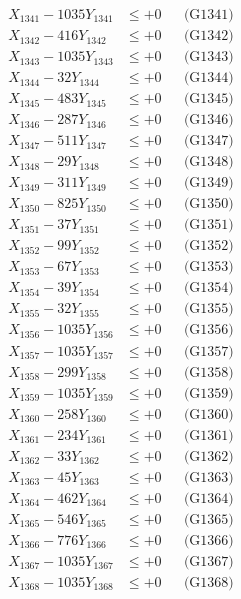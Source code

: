 \documentclass[a4paper,10pt]{article}
\begin{document}
{\begin{align}
\allowbreak
X_{1341} - 1035Y_{1341} &\leq +0 && \text{(G1341)} \\
X_{1342} - 416Y_{1342} &\leq +0 && \text{(G1342)} \\
X_{1343} - 1035Y_{1343} &\leq +0 && \text{(G1343)} \\
X_{1344} - 32Y_{1344} &\leq +0 && \text{(G1344)} \\
X_{1345} - 483Y_{1345} &\leq +0 && \text{(G1345)} \\
X_{1346} - 287Y_{1346} &\leq +0 && \text{(G1346)} \\
X_{1347} - 511Y_{1347} &\leq +0 && \text{(G1347)} \\
X_{1348} - 29Y_{1348} &\leq +0 && \text{(G1348)} \\
X_{1349} - 311Y_{1349} &\leq +0 && \text{(G1349)} \\
X_{1350} - 825Y_{1350} &\leq +0 && \text{(G1350)} \\
\allowbreak
X_{1351} - 37Y_{1351} &\leq +0 && \text{(G1351)} \\
X_{1352} - 99Y_{1352} &\leq +0 && \text{(G1352)} \\
X_{1353} - 67Y_{1353} &\leq +0 && \text{(G1353)} \\
X_{1354} - 39Y_{1354} &\leq +0 && \text{(G1354)} \\
X_{1355} - 32Y_{1355} &\leq +0 && \text{(G1355)} \\
X_{1356} - 1035Y_{1356} &\leq +0 && \text{(G1356)} \\
X_{1357} - 1035Y_{1357} &\leq +0 && \text{(G1357)} \\
X_{1358} - 299Y_{1358} &\leq +0 && \text{(G1358)} \\
X_{1359} - 1035Y_{1359} &\leq +0 && \text{(G1359)} \\
X_{1360} - 258Y_{1360} &\leq +0 && \text{(G1360)} \\
\allowbreak
X_{1361} - 234Y_{1361} &\leq +0 && \text{(G1361)} \\
X_{1362} - 33Y_{1362} &\leq +0 && \text{(G1362)} \\
X_{1363} - 45Y_{1363} &\leq +0 && \text{(G1363)} \\
X_{1364} - 462Y_{1364} &\leq +0 && \text{(G1364)} \\
X_{1365} - 546Y_{1365} &\leq +0 && \text{(G1365)} \\
X_{1366} - 776Y_{1366} &\leq +0 && \text{(G1366)} \\
X_{1367} - 1035Y_{1367} &\leq +0 && \text{(G1367)} \\
X_{1368} - 1035Y_{1368} &\leq +0 && \text{(G1368)} \\

\end{align}}
\end{document}
